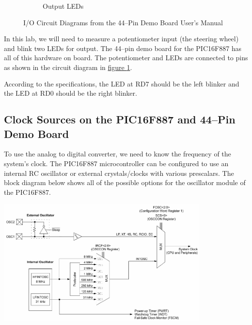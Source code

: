 \documentclass[11pt]{article}
\begin{document}
\begin{figure}
\begin{subfigure}[b]{0.3\textwidth}
		\caption[]%
		{{Output LEDs}}
	\end{subfigure}	
	\caption{I/O Circuit Diagrams from the 44--Pin Demo Board User's Manual}
	\label{io-circuit-diagram}
\end{figure}

In this lab, we will need to measure a potentiometer input (the steering wheel)
and blink two LEDs for output. The 44--pin demo board for the PIC16F887
has all of this hardware on board. The potentiometer and LEDs are connected to
pins as shown in the circuit diagram in
\hyperref[io-circuit-diagram]{figure \ref{io-circuit-diagram}}.

According to the specifications, the LED at RD7 should be the left blinker
and the LED at RD0 should be the right blinker.

\subsection{Clock Sources on the PIC16F887 and 44--Pin Demo Board}
\label{clock-sources-section}

To use the analog to digital converter, we need to know the frequency of
the system's clock. The PIC16F887 microcontroller can be configured to
use an internal RC oscillator or external crystals/clocks with various
prescalars. The block diagram below shows all of the possible options
for the oscillator module of the PIC16F887.

\begin{center}
	\includegraphics[width=0.8\textwidth]{Figures/pic16f887-clock-sources-diagram.pdf}
\end{center}
\end{document}
